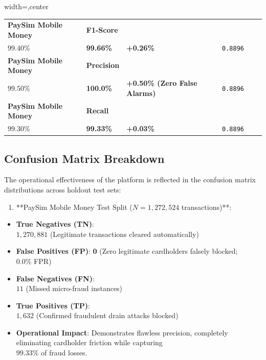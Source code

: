 \documentclass[12pt,a4paper,oneside]{report}
\begin{document}
\begin{table}[H]
\begin{adjustbox}{width=\textwidth,center}
\begin{tabular}{| l | l | l | l | l | l |}
\textbf{PaySim Mobile Money} & \textbf{F1-Score} & \\$99.40\%$ & \textbf{99.66\%} & \textbf{+0.26\%} & \texttt{0.8896} \\ \hline
\rowcolor{tablealt} \textbf{PaySim Mobile Money} & \textbf{Precision} & \\$99.50\%$ & \textbf{100.0\%} & \textbf{+0.50\% (Zero False Alarms)} & \texttt{0.8896} \\ \hline
\textbf{PaySim Mobile Money} & \textbf{Recall} & \\$99.30\%$ & \textbf{99.33\%} & \textbf{+0.03\%} & \texttt{0.8896} \\ \hline
\end{tabular}
\end{adjustbox}
\end{table}


\subsection{Confusion Matrix Breakdown}

The operational effectiveness of the platform is reflected in the confusion matrix distributions across holdout test sets:


\begin{enumerate}[leftmargin=0.35in]
\item **PaySim Mobile Money Test Split ($N = 1,272,524$ transactions)**:
\end{enumerate}
\begin{itemize}[leftmargin=0.35in]
\item \textbf{True Negatives (TN)}: \\$1,270,881$ (Legitimate transactions cleared automatically)
\item \textbf{False Positives (FP)}: \textbf{0} (Zero legitimate cardholders falsely blocked; \\$0.0\%$ FPR)
\item \textbf{False Negatives (FN)}: \\$11$ (Missed micro-fraud instances)
\item \textbf{True Positives (TP)}: \\$1,632$ (Confirmed fraudulent drain attacks blocked)
\item \textbf{Operational Impact}: Demonstrates flawless precision, completely eliminating cardholder friction while capturing \\$99.33\%$ of fraud losses.
\end{itemize}
\end{document}
